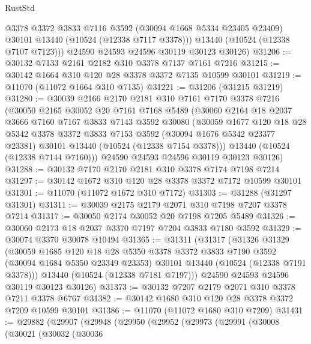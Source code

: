 \begin{lexlean}{RustStd}
\begin{coremodule}
          @3378
          @3372
          @3833
          @7116
          @3592
          (@30094 @1668 @5334 @23405 @23409)
          @30101
          @13440
          (@10524 (@12338 @7117 @3378)))
        @13440
        (@10524 (@12338 @7107 @7123)))
      @24590
      @24593
      @24596
      @30119
      @30123
      @30126)
@31206 := @30132 @7133 @2161 @2182 @310 @3378 @7137 @7161 @7216
@31215 := @30142 @1664 @310 @120 @28 @3378 @3372 @7135 @10599 @30101
@31219 := @11070 (@11072 @1664 @310 @7135)
@31221 := @31206 (@31215 @31219)
@31280 := @30039
    @2166
    @2170
    @2181
    @310
    @7161
    @7170
    @3378
    @7216
    (@30050
      @2165
      @30052
      @20
      @7161
      @7168
      @5489
      (@30060
        @2164
        @18
        @2037
        @3666
        @7160
        @7167
        @3833
        @7143
        @3592
        @30080
        (@30059
          @1677
          @120
          @18
          @28
          @5342
          @3378
          @3372
          @3833
          @7153
          @3592
          (@30094 @1676 @5342 @23377 @23381)
          @30101
          @13440
          (@10524 (@12338 @7154 @3378)))
        @13440
        (@10524 (@12338 @7144 @7160)))
      @24590
      @24593
      @24596
      @30119
      @30123
      @30126)
@31288 := @30132 @7170 @2170 @2181 @310 @3378 @7174 @7198 @7214
@31297 := @30142 @1672 @310 @120 @28 @3378 @3372 @7172 @10599 @30101
@31301 := @11070 (@11072 @1672 @310 @7172)
@31303 := @31288 (@31297 @31301)
@31311 := @30039 @2175 @2179 @2071 @310 @7198 @7207 @3378 @7214
@31317 := @30050 @2174 @30052 @20 @7198 @7205 @5489
@31326 := @30060 @2173 @18 @2037 @3370 @7197 @7204 @3833 @7180 @3592
@31329 := @30074 @3370 @30078 @10494
@31365 := @31311
    (@31317
      (@31326
        @31329
        (@30059
          @1685
          @120
          @18
          @28
          @5350
          @3378
          @3372
          @3833
          @7190
          @3592
          (@30094 @1684 @5350 @23349 @23353)
          @30101
          @13440
          (@10524 (@12338 @7191 @3378)))
        @13440
        (@10524 (@12338 @7181 @7197)))
      @24590
      @24593
      @24596
      @30119
      @30123
      @30126)
@31373 := @30132 @7207 @2179 @2071 @310 @3378 @7211 @3378 @6767
@31382 := @30142 @1680 @310 @120 @28 @3378 @3372 @7209 @10599 @30101
@31386 := @11070 (@11072 @1680 @310 @7209)
@31431 := @29882
    (@29907
      (@29948
        (@29950
          (@29952
            (@29973
              (@29991
                (@30008
                  (@30021
                    (@30032
                      (@30036

\end{coremodule}
\end{lexlean}
